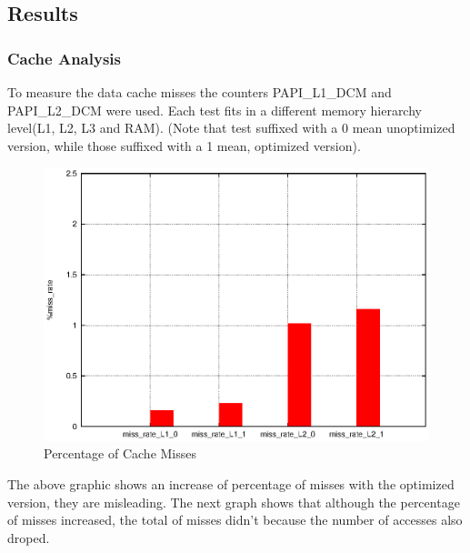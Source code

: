 \documentclass[a4paper,10pt,openright,openbib,twocolumn]{article}
\begin{document}
\subsection{Results}
\subsubsection{Cache Analysis}

 To measure the data cache misses the counters PAPI\_L1\_DCM and PAPI\_L2\_DCM were used. Each test fits in a different memory hierarchy level(L1, L2, L3 and RAM). (Note that test suffixed with a 0 mean unoptimized version, while those suffixed with a 1 mean, optimized version).

\begin{figure}[!htp]
	\centering
	\begin{minipage}[t]{\columnwidth}
		\includegraphics[width=\textwidth]{images/caches.eps}
		\caption{Percentage of Cache Misses \label{fig:cachel1}}
	\end{minipage}
\end{figure}

The above graphic shows an increase of percentage of misses with the optimized version, they are misleading. The next graph shows that although the percentage of misses increased, the total of misses didn't because the number of accesses also droped.
\end{document}

